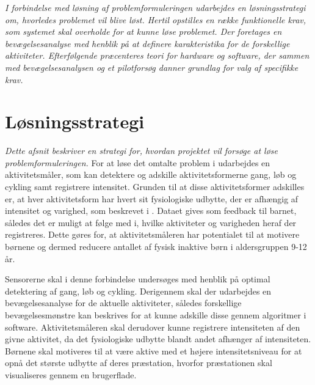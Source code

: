 \textit{I forbindelse med løsning af problemformuleringen udarbejdes en løsningsstrategi om, hvorledes problemet vil blive løst. Hertil opstilles en række funktionelle krav, som systemet skal overholde for at kunne løse problemet. Der foretages en bevægelsesanalyse med henblik på at definere karakteristika for de forskellige aktiviteter. Efterfølgende præcenteres teori for hardware og software, der sammen med bevægelsesanalysen og et pilotforsøg danner grundlag for valg af specifikke krav.}

\section{Løsningsstrategi}
\textit{Dette afsnit beskriver en strategi for, hvordan projektet vil forsøge at løse problemformuleringen.}
For at løse det omtalte problem i  udarbejdes en aktivitetsmåler, som kan detektere og adskille aktivitetsformerne gang, løb og cykling samt registrere intensitet. Grunden til at disse aktivitetsformer adskilles er, at hver aktivitetsform har hvert sit fysiologiske udbytte, der er afhængig af intensitet og varighed, som beskrevet i . Dataet gives som feedback til barnet, således det er muligt at følge med i, hvilke aktiviteter og varigheden heraf der registreres. Dette gøres for, at aktivitetsmåleren har potentialet til at motivere børnene og dermed reducere antallet af fysisk inaktive børn i aldersgruppen 9-12 år.

Sensorerne skal i denne forbindelse undersøges med henblik på optimal detektering af gang, løb og cykling. Derigennem skal der udarbejdes en bevægelsesanalyse for de aktuelle aktiviteter, således forskellige bevægelsesmønstre kan beskrives for at kunne adskille disse gennem algoritmer i software. Aktivitetsmåleren skal derudover kunne registrere intensiteten af den givne aktivitet, da det fysiologiske udbytte blandt andet afhænger af intensiteten. Børnene skal motiveres til at være aktive med et højere intensitetsniveau for at opnå det største udbytte af deres præstation, hvorfor præstationen skal visualiseres gennem en brugerflade.%


